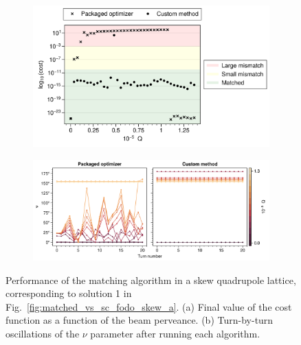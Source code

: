 \begin{figure}[!p]
    \centering
    \begin{subfigure}{0.8\textwidth}
        \includegraphics[width=\textwidth]{Images/chapter2/optimizer_comparison_costfunc.png}
        \caption{}
        \label{fig:optimizer_comparison_a}
    \end{subfigure}
    \vfill
    \vspace*{0.5cm}
    \vfill
    \begin{subfigure}{1.0\textwidth}
        \includegraphics[width=\textwidth]{Images/chapter2/optimizer_comparison_tbt.png}
        \caption{}
        \label{fig:optimizer_comparison_b}
    \end{subfigure}
    \caption{Performance of the matching algorithm in a skew quadrupole lattice, corresponding to solution 1 in Fig.~\ref{fig:matched_vs_sc_fodo_skew_a}. (a) Final value of the cost function as a function of the beam perveance. (b) Turn-by-turn oscillations of the $\nu$ parameter after running each algorithm.}
    \label{fig:optimizer_comparison}
\end{figure}
%

